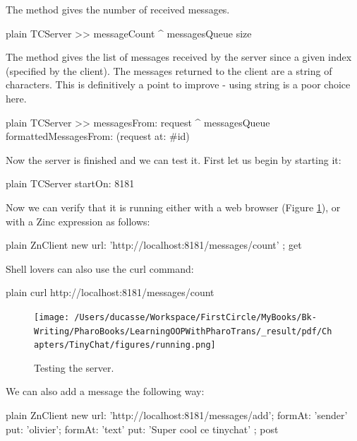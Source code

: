 \documentclass[10pt,twoside,english]{_support/latex/sbabook/sbabook}
\begin{document}
The method  gives the number of received messages. 

\begin{displaycode}{plain}
TCServer >> messageCount
	^ messagesQueue size
\end{displaycode}

The method  gives the list of messages received by the server since a given index (specified by the client).
The messages returned to the client are a string of characters. This is definitively a point to improve - using string is a poor choice here. 

\begin{displaycode}{plain}
TCServer >> messagesFrom: request
	^ messagesQueue formattedMessagesFrom: (request at: #id)  
\end{displaycode}

Now the server is finished and we can test it. 
First let us begin by starting it:  

\begin{displaycode}{plain}
	TCServer startOn: 8181
\end{displaycode}

Now we can verify that it is running either with a web browser (Figure \ref{running}), or with a Zinc expression as follows: 

\begin{displaycode}{plain}
ZnClient new url: 'http://localhost:8181/messages/count' ; get
\end{displaycode}

Shell lovers can also use the curl command:

\begin{displaycode}{plain}
	curl http://localhost:8181/messages/count
\end{displaycode}


\begin{figure}

\begin{center}
\texttt{[image: /Users/ducasse/Workspace/FirstCircle/MyBooks/Bk-Writing/PharoBooks/LearningOOPWithPharoTrans/\_result/pdf/Chapters/TinyChat/figures/running.png]}\caption{Testing the server.\label{running}}\end{center}
\end{figure}


We can also add a message the following way:

\begin{displaycode}{plain}
ZnClient new 
	url: 'http://localhost:8181/messages/add';
	formAt: 'sender' put: 'olivier';
	formAt: 'text' put: 'Super cool ce tinychat' ; post
\end{displaycode}
\end{document}
